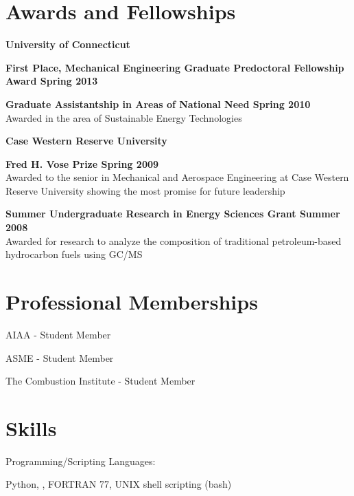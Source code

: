 \section{Awards and Fellowships}
\textbf{ University of Connecticut}
\begin{outerlist}
   \item \textbf{First Place, Mechanical Engineering Graduate Predoctoral Fellowship Award \hfill Spring 2013} 

   \item \textbf{ Graduate Assistantship in Areas of National Need \hfill Spring 2010}\\
Awarded in the area of Sustainable Energy Technologies
\end{outerlist}
\vspace{0.1in}
\textbf{ Case Western Reserve University}
\begin{outerlist}

   \item \textbf{ Fred H. Vose Prize \hfill Spring 2009}\\
Awarded to the senior in Mechanical and Aerospace Engineering at Case Western Reserve University showing the most promise for future leadership

   \item \textbf{ Summer Undergraduate Research in Energy Sciences Grant \hfill Summer 2008}\\
Awarded for research to analyze the composition of traditional petroleum-based hydrocarbon fuels using GC/MS

\end{outerlist}

\section{Professional Memberships}
AIAA - Student Member

ASME - Student Member

The Combustion Institute - Student Member


\section{Skills}
Programming/Scripting Languages:
%
\begin{innerlist}
    \item Python, \Matlab, FORTRAN 77, UNIX shell scripting (bash)
\end{innerlist}

